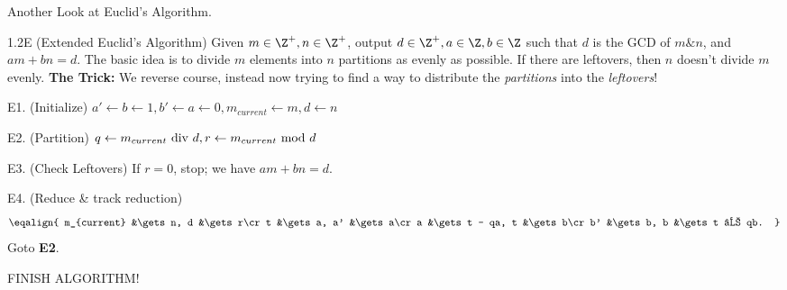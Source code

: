 
\topic Another Look at Euclid's Algorithm.

\beginalgo 1.2E (Extended Euclid's Algorithm)
Given $m\in\Z^+, n\in\Z^+$, output $d\in\Z^+, a\in\Z, b\in\Z$ such
that $d$ is the GCD of $m \& n$, and $am + bn = d$. \smallskip\noindent The basic idea is
to divide $m$ elements into $n$ partitions as evenly as possible. If
there are leftovers, then $n$ doesn't divide $m$ evenly. {\bf The
Trick: } We reverse course, instead now trying to find a way to
distribute the  {\it partitions} into the {\it leftovers}!

\algostep E1. (Initialize) $a' \gets b \gets 1, b' \gets a \gets 0, m_{current} \gets m, d \gets n$

\algostep E2. (Partition) $q\gets m_{current} \hbox{ div } d, r \gets m_{current} \hbox{ mod } d$

\algostep E3. (Check Leftovers) If $r = 0$, stop; we have $am + bn = d$.

\algostep E4. (Reduce \& track reduction)
$$\eqalign
{
m_{current} &\gets n, d &\gets r\cr
t &\gets a, a' &\gets a\cr
a &\gets t - qa, t &\gets b\cr
b' &\gets b, b &\gets t − qb.
}$$
Goto {\bf E2}.

\TODO FINISH ALGORITHM!
\endalgo

\bye
